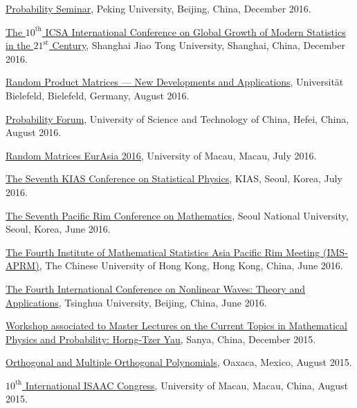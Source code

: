 \documentclass[12pt,a4paper]{article}
\newenvironment{item_list}{
 \begin{list}{}{
   \setlength{\leftmargin}{1.5em}
   \setlength{\itemsep}{0.25em}
   \setlength{\parskip}{0pt}
   \setlength{\parsep}{0.25em}
 }
}{
 \end{list}
}
\begin{document}
\begin{item_list}
\item
  \href{http://www.math.pku.edu.cn/teachers/liuyong/seminar/wangdong2016.pdf}{Probability Seminar}, Peking University, Beijing, China, December 2016.
\item
  \href{http://www.math.sjtu.edu.cn/conference/2016icsa/}{The $10^{\text{th}}$ ICSA International Conference on Global Growth of Modern Statistics in the $21^{\text{st}}$ Century}, Shanghai Jiao Tong University, Shanghai, China, December 2016.
\item
  \href{https://www2.physik.uni-bielefeld.de/rpm_2016.html}{Random Product Matrices --- New Developments and Applications}, Universit\"{a}t Bielefeld, Bielefeld, Germany, August 2016.
\item
  \href{http://home.ustc.edu.cn/~shanamy3/index.html}{Probability Forum}, University of Science and Technology of China, Hefei, China, August 2016.
\item
  \href{http://www.fst.umac.mo/conference/RandomMatricesEurAsia2016/Abstracts/Blower_abstract.pdf}{Random Matrices EurAsia 2016}, University of Macau, Macau, July 2016.
\item 
  \href{http://home.kias.re.kr/psec/nspcs16/}{The Seventh KIAS Conference on Statistical Physics}, KIAS, Seoul, Korea, July 2016.
\item
  \href{http://prcm.math.snu.ac.kr/}{The Seventh Pacific Rim Conference on Mathematics}, Seoul National University, Seoul, Korea, June 2016.
\item
  \href{http://ims-aprm2016.sta.cuhk.edu.hk/}{The Fourth Institute of Mathematical Statistics Asia Pacific Rim Meeting (IMS-APRM)}, The Chinese University of Hong Kong, Hong Kong, China, June 2016.
\item
  \href{http://icnwta4.csp.escience.cn/dct/page/1}{The Fourth International Conference on Nonlinear Waves: Theory and Applications}, Tsinghua University, Beijing, China, June 2016.
\item
  \href{http://ymsc.tsinghua.edu.cn/sanya/2016/MHTY2016/synopsis_and_organizers.aspx}{Workshop associated to Master Lectures on the Current Topics in Mathematical Physics and Probability: Horng-Tzer Yau}, Sanya, China, December 2015.
\item
  \href{http://www.birs.ca/events/2015/5-day-workshops/15w5022}{Orthogonal and Multiple Orthogonal Polynomials}, Oaxaca, Mexico, August 2015.
\item
  \href{http://www.fst.umac.mo/conference/isaac2015/}{$10^{\text{th}}$ International ISAAC Congress}, University of Macau, Macau, China, August 2015.

\end{item_list}
\end{document}
